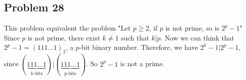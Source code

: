 \subsection*{Problem 28}
\noindent This problem equivalent the problem "Let $p \geq 2$, if $p$ is not prime, so is $2^p - 1$" \\
Since $p$ is not prime, there exist $k \neq 1$ such that $k | p$. Now we can think that $2^p - 1 = (111...1)_2$, a $p$-bit binary number. Therefore, we have $2^k - 1 | 2^p - 1$, since $(\underbrace{111...1}_\text{$k$-bits}) | (\underbrace{111...1}_\text{$p$-bits})$. So $2^p - 1$ is not a prime.

